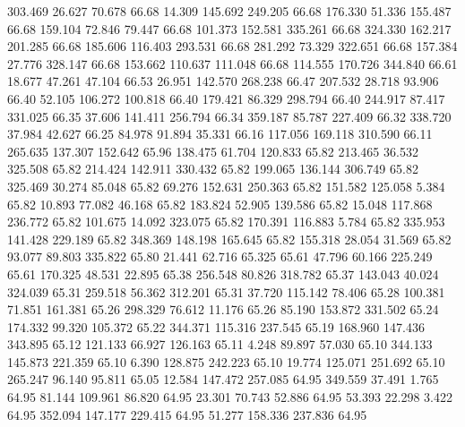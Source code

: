  303.469   26.627   70.678        66.68
  14.309  145.692  249.205        66.68
 176.330   51.336  155.487        66.68
 159.104   72.846   79.447        66.68
 101.373  152.581  335.261        66.68
 324.330  162.217  201.285        66.68
 185.606  116.403  293.531        66.68
 281.292   73.329  322.651        66.68
 157.384   27.776  328.147        66.68
 153.662  110.637  111.048        66.68
 114.555  170.726  344.840        66.61
  18.677   47.261   47.104        66.53
  26.951  142.570  268.238        66.47
 207.532   28.718   93.906        66.40
  52.105  106.272  100.818        66.40
 179.421   86.329  298.794        66.40
 244.917   87.417  331.025        66.35
  37.606  141.411  256.794        66.34
 359.187   85.787  227.409        66.32
 338.720   37.984   42.627        66.25
  84.978   91.894   35.331        66.16
 117.056  169.118  310.590        66.11
 265.635  137.307  152.642        65.96
 138.475   61.704  120.833        65.82
 213.465   36.532  325.508        65.82
 214.424  142.911  330.432        65.82
 199.065  136.144  306.749        65.82
 325.469   30.274   85.048        65.82
  69.276  152.631  250.363        65.82
 151.582  125.058    5.384        65.82
  10.893   77.082   46.168        65.82
 183.824   52.905  139.586        65.82
  15.048  117.868  236.772        65.82
 101.675   14.092  323.075        65.82
 170.391  116.883    5.784        65.82
 335.953  141.428  229.189        65.82
 348.369  148.198  165.645        65.82
 155.318   28.054   31.569        65.82
  93.077   89.803  335.822        65.80
  21.441   62.716   65.325        65.61
  47.796   60.166  225.249        65.61
 170.325   48.531   22.895        65.38
 256.548   80.826  318.782        65.37
 143.043   40.024  324.039        65.31
 259.518   56.362  312.201        65.31
  37.720  115.142   78.406        65.28
 100.381   71.851  161.381        65.26
 298.329   76.612   11.176        65.26
  85.190  153.872  331.502        65.24
 174.332   99.320  105.372        65.22
 344.371  115.316  237.545        65.19
 168.960  147.436  343.895        65.12
 121.133   66.927  126.163        65.11
   4.248   89.897   57.030        65.10
 344.133  145.873  221.359        65.10
   6.390  128.875  242.223        65.10
  19.774  125.071  251.692        65.10
 265.247   96.140   95.811        65.05
  12.584  147.472  257.085        64.95
 349.559   37.491    1.765        64.95
  81.144  109.961   86.820        64.95
  23.301   70.743   52.886        64.95
  53.393   22.298    3.422        64.95
 352.094  147.177  229.415        64.95
  51.277  158.336  237.836        64.95
